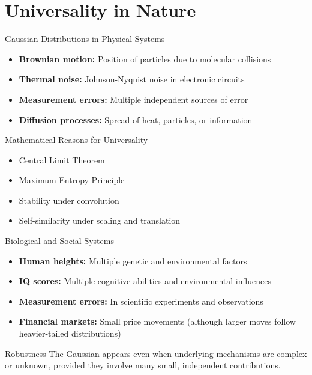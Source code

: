 \documentclass{beamer}
\begin{document}
\section{Universality in Nature}

\begin{frame}{Gaussian Distributions in Physical Systems}
  \begin{itemize}
    \item \textbf{Brownian motion:} Position of particles due to molecular collisions
    \item \textbf{Thermal noise:} Johnson-Nyquist noise in electronic circuits
    \item \textbf{Measurement errors:} Multiple independent sources of error
    \item \textbf{Diffusion processes:} Spread of heat, particles, or information
  \end{itemize}
  
  \begin{block}{Mathematical Reasons for Universality}
    \begin{itemize}
      \item Central Limit Theorem
      \item Maximum Entropy Principle
      \item Stability under convolution
      \item Self-similarity under scaling and translation
    \end{itemize}
  \end{block}
\end{frame}

\begin{frame}{Biological and Social Systems}
  \begin{itemize}
    \item \textbf{Human heights:} Multiple genetic and environmental factors
    \item \textbf{IQ scores:} Multiple cognitive abilities and environmental influences
    \item \textbf{Measurement errors:} In scientific experiments and observations
    \item \textbf{Financial markets:} Small price movements (although larger moves follow heavier-tailed distributions)
  \end{itemize}
  
  \begin{block}{Robustness}
    The Gaussian appears even when underlying mechanisms are complex or unknown, provided they involve many small, independent contributions.
  \end{block}
\end{frame}
\end{document}
